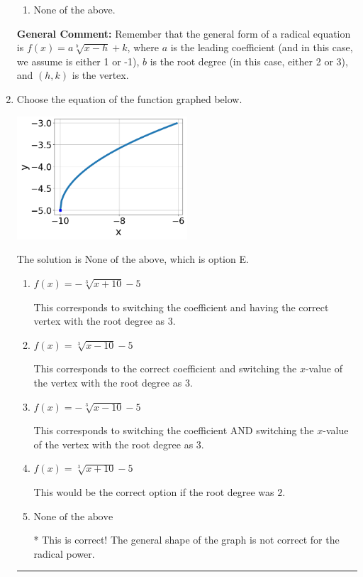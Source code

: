 \documentclass{extbook}[14pt]
\newcommand{\litem}[1]{\item #1

\rule{\textwidth}{0.4pt}}
\begin{document}
\begin{enumerate}
{\begin{enumerate}[label=\Alph*.]
\begin{multicols}{2}
\end{multicols}\item None of the above.\end{enumerate}
\textbf{General Comment:} Remember that the general form of a radical equation is $ f(x) = a \sqrt[b]{x - h} + k $, where $a$ is the leading coefficient (and in this case, we assume is either 1 or -1), $b$ is the root degree (in this case, either 2 or 3), and $(h, k)$ is the vertex.
}
\litem{
Choose the equation of the function graphed below.

\begin{center}
    \includegraphics[width=0.5\textwidth]{../Figures/radicalGraphToEquationCopyB.png}
\end{center}


The solution is \( \text{None of the above} \), which is option E.\begin{enumerate}[label=\Alph*.]
\item \( f(x) = - \sqrt[3]{x + 10} - 5 \)

This corresponds to switching the coefficient and having the correct vertex with the root degree as $3$.
\item \( f(x) = \sqrt[3]{x - 10} - 5 \)

This corresponds to the correct coefficient and switching the $x$-value of the vertex with the root degree as $3$.
\item \( f(x) = - \sqrt[3]{x - 10} - 5 \)

This corresponds to switching the coefficient AND switching the $x$-value of the vertex with the root degree as $3$.
\item \( f(x) = \sqrt[3]{x + 10} - 5 \)

This would be the correct option if the root degree was $2$.
\item \( \text{None of the above} \)

* This is correct! The general shape of the graph is not correct for the radical power.
\end{enumerate}

}
\end{enumerate}
\end{document}
